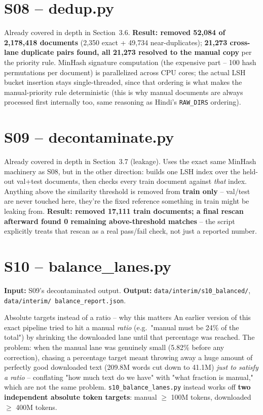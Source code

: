 \documentclass[11pt]{report}
\begin{document}
\section{S08 -- dedup.py}

Already covered in depth in Section~3.6. \textbf{Result: removed 52,084
of 2,178,418 documents} (2,350 exact + 49,734 near-duplicates);
\textbf{21,273 cross-lane duplicate pairs found, all 21,273 resolved to
the manual copy} per the priority rule. MinHash signature computation
(the expensive part -- 100 hash permutations per document) is
parallelized across CPU cores; the actual LSH bucket insertion stays
single-threaded, since that ordering is what makes the manual-priority
rule deterministic (this is why manual documents are always processed
first internally too, same reasoning as Hindi's \texttt{RAW\_DIRS}
ordering).

\section{S09 -- decontaminate.py}

Already covered in depth in Section~3.7 (leakage). Uses the exact same MinHash machinery as S08, but in the other
direction: builds one LSH index over the held-out val+test documents,
then checks every train document against \textit{that} index. Anything
above the similarity threshold is removed from \textbf{train only} --
val/test are never touched here, they're the fixed reference something
in train might be leaking from. \textbf{Result: removed 17,111 train
documents; a final rescan afterward found 0 remaining above-threshold
matches} -- the script explicitly treats that rescan as a real
pass/fail check, not just a reported number.

\section{S10 -- balance\_lanes.py}

\textbf{Input:} S09's decontaminated output. \textbf{Output:}
\texttt{data/interim/s10\_balanced/}, \texttt{data/interim/
balance\_report.json}.

\begin{concept}{Absolute targets instead of a ratio -- why this matters}
An earlier version of this exact pipeline tried to hit a manual
\textit{ratio} (e.g.\ "manual must be 24\% of the total") by shrinking the
downloaded lane until that percentage was reached. The problem: when the
manual lane was genuinely small (5.82\% before any correction), chasing
a percentage target meant throwing away a huge amount of perfectly good
downloaded text (209.8M words cut down to 41.1M) \textit{just to satisfy
a ratio} -- conflating "how much text do we have" with "what fraction is
manual," which are not the same problem. \texttt{s10\_balance\_lanes.py}
instead works off \textbf{two independent absolute token targets}: manual
$\geq$ 100M tokens, downloaded $\geq$ 400M tokens.
\end{concept}
\end{document}

